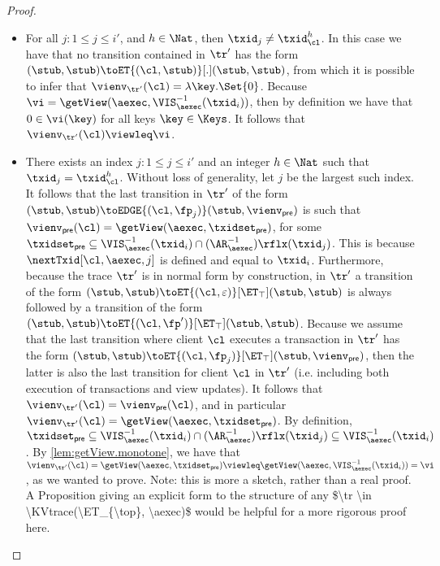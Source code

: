 \begin{proof}
\begin{itemize}
\begin{enumerate}
\begin{itemize}
\item For all $j : 1 \leq j \leq i'$, and $h \in \Nat$, then $\txid_{j} \neq \txid_{\cl}^{h}$.
In this case we have that no transition contained in $\tr'$ has the form 
$(\stub, \stub) \toET{(\cl, \stub)}[.] (\stub, \stub)$, from which it is possible to infer 
that  $\vienv_{\tr'}(\cl) = \lambda \key. \Set{0}$. Because $\vi = \getView(\aexec, \VIS^{-1}_{\aexec}(\txid_{i}))$, 
then by definition we have that $0 \in \vi(\key)$ for all keys $\key \in \Keys$. It follows that 
$\vienv_{\tr'}(\cl) \viewleq \vi$. 

\item There exists an index $j : 1 \leq j \leq i'$ and an integer $h \in \Nat$ such that $\txid_{j} = \txid_{\cl}^{h}$. 
Without loss of generality, let $j$ be the largest such index. 
It follows that the last transition in $\tr'$ of the form $(\stub, \stub) \toEDGE{(\cl, \fp_{j})} (\stub, \vienv_{\mathsf{pre}})$ 
is such that $\vienv_{\mathsf{pre}}(\cl) = \getView(\aexec, \txidset_{\mathsf{pre}})$, 
for some $\txidset_{\mathsf{pre}} \subseteq \VIS^{-1}_{\aexec}(\txid_{i}) \cap (\AR^{-1}_{\aexec})\rflx(\txid_{j})$.
This is because $\nextTxid[\cl, \aexec, j]$  is defined and equal to $\txid_{i}$. 
Furthermore, because the trace $\tr'$ is in normal form by construction, 
in $\tr'$ a transition of the form $(\stub, \stub) \toET{(\cl, \varepsilon)}[\ET_{\top}] (\stub, \stub)$ 
is always followed by a transition of the form $(\stub, \stub) \toET{(\cl, \fp')}[\ET_{\top}] (\stub, \stub)$. 
Because we assume that the last transition where client $\cl$ executes a transaction in $\tr'$ 
has the form $(\stub, \stub) \toET{(\cl, \fp_{j})}[\ET_{\top}] (\stub, \vienv_{\mathsf{pre}})$, 
then the latter is also the last transition for client $\cl$ in $\tr'$ 
(i.e. including both execution of transactions and view updates). 
It follows that $\vienv_{\tr'}(\cl) = \vienv_{\mathsf{pre}}(\cl)$, and in particular 
$\vienv_{\tr'}(\cl) = \getView(\aexec, \txidset_{\mathsf{pre}})$. By definition, 
$\txidset_{\mathsf{pre}} \subseteq  \VIS^{-1}_{\aexec}(\txid_{i}) \cap (\AR^{-1}_{\aexec})\rflx(\txid_{j}) 
\subseteq \VIS^{-1}_{\aexec}(\txid_{i})$. By  \cref{lem:getView.monotone}, 
we have that $\vienv_{\tr'}(\cl) = \getView(\aexec, \txidset_{\mathsf{pre}}) \viewleq 
\getView(\aexec, \VIS^{-1}_{\aexec}(\txid_{i})) = \vi$, as we wanted to prove.
\ac{Note: this is more a sketch, rather than a real proof. A Proposition giving an explicit form to the 
structure of any $\tr \in \KVtrace(\ET_{\top}, \aexec)$ would be helpful for a more rigorous proof here.}
\end{itemize}



\end{enumerate}
\end{itemize}
\end{proof}
